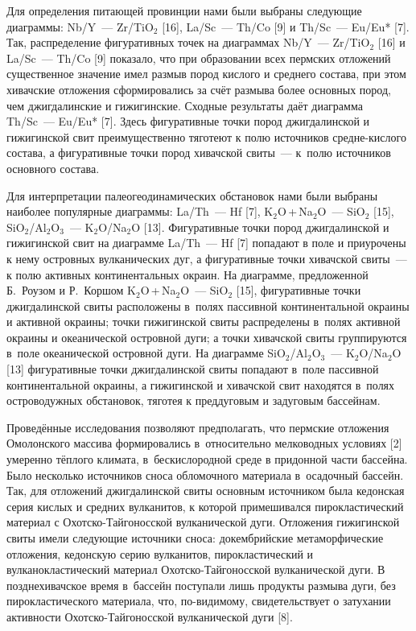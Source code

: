 Для определения питающей провинции нами были выбраны следующие диаграммы: Nb/Y~--- Zr/TiO$_2$ [16], La/Sc~--- Th/Co [9] и Th/Sc~--- Eu/Eu* [7]. Так, распределение фигуративных точек на диаграммах Nb/Y~--- Zr/TiO$_2$ [16] и La/Sc~--- Th/Co [9] показало, что при образовании всех пермских отложений существенное значение имел размыв пород кислого и среднего состава, при этом хивачские отложения сформировались за счёт размыва более основных пород, чем джигдалинские и гижигинские. Сходные результаты даёт диаграмма Th/Sc~--- Eu/Eu* [7]. Здесь фигуративные точки пород джигдалинской и гижигинской свит преимущественно тяготеют к полю источников средне-кислого состава, а фигуративные точки пород хивачской свиты~--- к~полю источников основного состава.

Для интерпретации палеогеодинамических обстановок нами были выбраны наиболее популярные диаграммы: La/Th~--- Hf [7], K$_2$O\,+\,Na$_2$O~--- SiO$_2$ [15], SiO$_2$/Al$_2$O$_3$~--- K$_2$O/Na$_2$O [13]. Фигуративные точки пород джигдалинской и гижигинской свит на диаграмме La/Th~--- Hf [7] попадают в поле и приурочены к нему островных вулканических дуг, а фигуративные точки хивачской свиты~--- к полю активных континентальных окраин. На диаграмме, предложенной Б.~Роузом и Р.~Коршом K$_2$O\,+\,Na$_2$O~--- SiO$_2$ [15], фигуративные точки джигдалинской свиты расположены в~полях пассивной континентальной окраины и активной окраины; точки гижигинской свиты распределены в~полях активной окраины и океанической островной дуги; а точки хивачской свиты группируются в~поле океанической островной дуги. На диаграмме SiO$_2$/Al$_2$O$_3$~--- K$_2$O/Na$_2$O [13] фигуративные точки джигдалинской свиты попадают в~поле пассивной континентальной окраины, а гижигинской и хивачской свит находятся в~полях островодужных обстановок, тяготея к преддуговым и задуговым бассейнам.

Проведённые исследования позволяют предполагать, что пермские отложения Омолонского массива формировались в~относительно мелководных условиях [2] умеренно тёплого климата, в~бескислородной среде в придонной части
бассейна. Было несколько источников сноса обломочного материала в~осадочный бассейн. Так, для отложений джигдалинской свиты основным источником была кедонская серия кислых и средних вулканитов, к которой примешивался пирокластический материал с Охотско-Тайгоносской вулканической дуги. Отложения гижигинской свиты имели следующие источники сноса: докембрийские метаморфические отложения, кедонскую серию вулканитов, пирокластический и вулканокластический материал Охотско-Тайгоносской вулканической дуги. В позднехивачское время в~бассейн поступали лишь продукты размыва дуги, без пирокластического материала, что, по-видимому, свидетельствует о затухании активности Охотско-Тайгоносской вулканической дуги [8].

